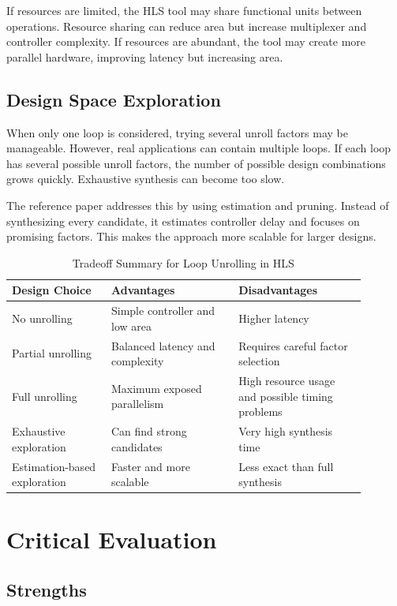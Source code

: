 \documentclass[conference]{IEEEtran}
\begin{document}
If resources are limited, the HLS tool may share functional units between operations. Resource sharing can reduce area but increase multiplexer and controller complexity. If resources are abundant, the tool may create more parallel hardware, improving latency but increasing area.

\subsection{Design Space Exploration}

When only one loop is considered, trying several unroll factors may be manageable. However, real applications can contain multiple loops. If each loop has several possible unroll factors, the number of possible design combinations grows quickly. Exhaustive synthesis can become too slow.

The reference paper addresses this by using estimation and pruning. Instead of synthesizing every candidate, it estimates controller delay and focuses on promising factors. This makes the approach more scalable for larger designs.

\begin{table}[h]
\centering
\caption{Tradeoff Summary for Loop Unrolling in HLS}
\begin{tabular}{|p{0.25\linewidth}|p{0.32\linewidth}|p{0.32\linewidth}|}
\hline
\textbf{Design Choice} & \textbf{Advantages} & \textbf{Disadvantages} \\
\hline
No unrolling & Simple controller and low area & Higher latency \\
\hline
Partial unrolling & Balanced latency and complexity & Requires careful factor selection \\
\hline
Full unrolling & Maximum exposed parallelism & High resource usage and possible timing problems \\
\hline
Exhaustive exploration & Can find strong candidates & Very high synthesis time \\
\hline
Estimation-based exploration & Faster and more scalable & Less exact than full synthesis \\
\hline
\end{tabular}
\end{table}

\section{Critical Evaluation}

\subsection{Strengths}
\end{document}
